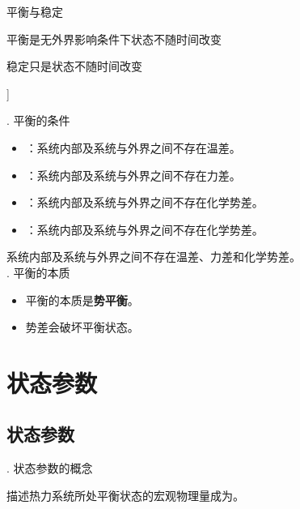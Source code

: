 \hspace*{1em} 平衡与稳定
\begin{myitemize}
	\item 平衡是无外界影响条件下状态不随时间改变\vspace*{-0.5em}
	\item 稳定只是状态不随时间改变
\end{myitemize}
]

. 平衡的条件
\begin{itemize}
	\item {}：系统内部及系统与外界之间不存在温差。
	\item {}：系统内部及系统与外界之间不存在力差。
	\item {}：系统内部及系统与外界之间不存在化学势差。
	\item {}：系统内部及系统与外界之间不存在化学势差。
\end{itemize}

\theorem[热力学平衡条件]
系统内部及系统与外界之间不存在温差、力差和化学势差。\\

. 平衡的本质
\begin{itemize}
	\item 平衡的本质是\textbf{势平衡}。
	\item 势差会破坏平衡状态。
\end{itemize}

\section{状态参数}
\subsection{状态参数}
. 状态参数的概念

描述热力系统所处平衡状态的宏观物理量成为。\\

